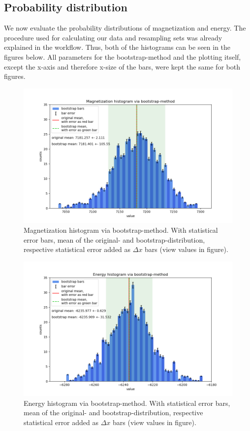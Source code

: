 \documentclass[11pt, letterpaper, onecolumn]{article}
\begin{document}
	\subsection{Probability distribution}
	We now evaluate the probability distributions of magnetization and energy. The procedure used for calculating our data and resampling sets was already explained in the workflow. Thus, both of the histograms can be seen in the figures below. All parameters for the bootstrap-method and the plotting itself, except the x-axis and therefore x-size of the bars, were kept the same for both figures.
	\begin{figure} [h] 
	\begin{center}
	\includegraphics[width=17cm]{"magn_histo_final.png"}
\caption{Magnetization histogram via bootstrap-method. With statistical error bars, mean of the original- and bootstrap-distribution, respective statistical error added as $\Delta x$ bars (view values in figure).}
	\end{center}
	\end{figure}
	\begin{figure} [h] 
	\begin{center}
	\includegraphics[width=17cm]{"energy_histo_final.png"}
\caption{Energy histogram via bootstrap-method. With statistical error bars, mean of the original- and bootstrap-distribution, respective statistical error added as $\Delta x$ bars (view values in figure).}
	\end{center}
	\end{figure}
\end{document}
